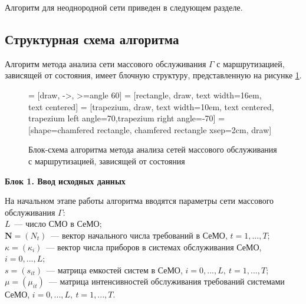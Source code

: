 \documentclass[a4paper,14pt]{extarticle}
\theoremstyle{note}
\begin{document}
Алгоритм для неоднородной сети приведен в следующем разделе.

\subsection{Структурная схема алгоритма}
\label{subsec:flowchart}

Алгоритм метода анализа сети массового обслуживания $\Gamma$ с маршрутизацией, зависящей от состояния, имеет блочную структуру, представленную на рисунке \ref{img:4.1}.

\begin{figure}[H]
\centering
{} = [draw, ->, >=angle 60]
 = [rectangle, draw, text width=16em, text centered]
 = [trapezium, draw, text width=10em, text centered, trapezium left angle=70,trapezium right angle=-70]
 = [shape=chamfered rectangle, chamfered rectangle xsep=2cm, draw]
\caption{Блок-схема алгоритма метода анализа сетей массового обслуживания с маршрутизацией, зависящей от состояния}
\label{img:4.1}
\end{figure}

\medskip
\textbf{Блок 1. Ввод исходных данных}

На начальном этапе работы алгоритма вводятся параметры сети массового обслуживания $\Gamma$:\\
$L$~--- число СМО в СеМО;\\
$\mathbf{N}=(N_t)$~--- вектор начального числа требований в СеМО, $t=1,...,T$;\\
$\kappa=(\kappa_i)$~--- вектор числа приборов в системах обслуживания СеМО, $i=0,...,L$;\\
$s=(s_{it})$~--- матрица емкостей систем в СеМО, $i=0,...,L,~t=1,...,T$;\\
$\mu=(\mu_{it})$~--- матрица интенсивностей обслуживания требований системами СеМО, $i=0,...,L,~t=1,...,T$.
\end{document}
